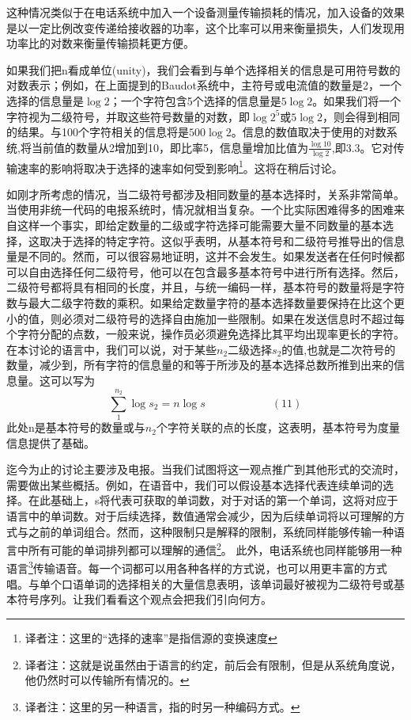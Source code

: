 \documentclass{hfutpaper}
\begin{document}
这种情况类似于在电话系统中加入一个设备测量传输损耗的情况，加入设备的效果是以一定比例改变传递给接收器的功率，这个比率可以用来衡量损失，人们发现用功率比的对数来衡量传输损耗更方便。


如果我们把n看成单位(unity)，我们会看到与单个选择相关的信息是可用符号数的对数表示；例如，在上面提到的Baudot系统中，主符号或电流值的数量是2，一个选择的信息量是$\log{2}$；一个字符包含5个选择的信息量是$5\log{2}$。如果我们将一个字符视为二级符号，并取这些符号数量的对数，即$\log{2^5}$或$5\log{2}$，则会得到相同的结果。与100个字符相关的信息将是$500\log{2}$。信息的数值取决于使用的对数系统,将当前值的数量从2增加到10，即比率5，信息量增加比值为$\frac{\log{10}}{\log{2}}$,即3.3。它对传输速率的影响将取决于选择的速率如何受到影响\footnote{译者注：这里的“选择的速率”是指信源的变换速度}。这将在稍后讨论。


如刚才所考虑的情况，当二级符号都涉及相同数量的基本选择时，关系非常简单。当使用非统一代码的电报系统时，情况就相当复杂。一个比实际困难得多的困难来自这样一个事实，即给定数量的二级或字符选择可能需要大量不同数量的基本选择，这取决于选择的特定字符。这似乎表明，从基本符号和二级符号推导出的信息量是不同的。然而，可以很容易地证明，这并不会发生。如果发送者在任何时候都可以自由选择任何二级符号，他可以在包含最多基本符号中进行所有选择。然后，二级符号都将具有相同的长度，并且，与统一编码一样，基本符号的数量将是字符数与最大二级字符数的乘积。如果给定数量字符的基本选择数量要保持在比这个更小的值，则必须对二级符号的选择自由施加一些限制。如果在发送信息时不超过每个字符分配的点数，一般来说，操作员必须避免选择比其平均出现率更长的字符。在本讨论的语言中，我们可以说，对于某些$n_2$二级选择$s_2$的值,也就是二次符号的数量，减少到，所有字符的信息量的和等于所涉及的基本选择总数所推到出来的信息量。这可以写为
\[\sum_{1}^{n_2}\log{s_2} =n \log{s} \qquad \qquad  \qquad (11)\]
此处n是基本符号的数量或与$n_2$个字符关联的点的长度，这表明，基本符号为度量信息提供了基础。



迄今为止的讨论主要涉及电报。当我们试图将这一观点推广到其他形式的交流时，需要做出某些概括。例如，在语音中，我们可以假设基本选择代表连续单词的选择。在此基础上，s将代表可获取的单词数，对于对话的第一个单词，这将对应于语言中的单词数。对于后续选择，数值通常会减少，因为后续单词将以可理解的方式与之前的单词组合。然而，这种限制只是解释的限制，系统同样能够传输一种语言中所有可能的单词排列都可以理解的通信\footnote{译者注：这就是说虽然由于语言的约定，前后会有限制，但是从系统角度说，他仍然时可以传输所有情况的。}。
此外，电话系统也同样能够用一种语言\footnote{译者注：这里的另一种语言，指的时另一种编码方式。}传输语音。每一个词都可以用各种各样的方式说，也可以用更丰富的方式唱。与单个口语单词的选择相关的大量信息表明，该单词最好被视为二级符号或基本符号序列。让我们看看这个观点会把我们引向何方。
\par
\end{document}
